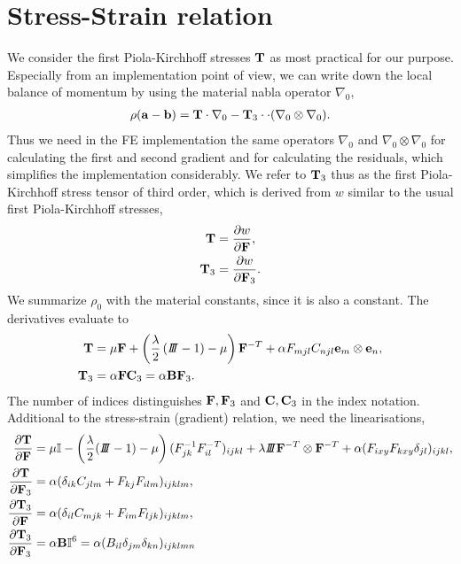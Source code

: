 \documentclass[a4paper]{article}
\begin{document}
\section{Stress-Strain relation}
We consider the first Piola-Kirchhoff stresses ${\mathbf{ T}}$ as most practical for 
our purpose. Especially from an implementation point of view, we can 
write down the local balance of momentum by using the material nabla 
operator $\nabla_0$,
\begin{align}
\rho({\mathbf{ a}}-{\mathbf{ b}})={\mathbf{ T}}\cdot\nabla_0-{\mathbf{ T}}_3\cdot\cdot(\nabla_0\otimes\nabla_0).
\end{align}
Thus we need in the FE implementation the same operators 
$\nabla_0$ and $\nabla_0\otimes\nabla_0$
for calculating the first and second gradient and for 
calculating the residuals, which 
simplifies the implementation considerably. 
We refer to ${\mathbf{ T}}_3$ thus as the first Piola-Kirchhoff stress tensor of 
third order, which is derived from $w$ similar to the usual first 
Piola-Kirchhoff stresses,
\begin{align}
{\mathbf{ T}}  &=\frac{\partial w}{\partial {\mathbf{ F}}},\\
{\mathbf{ T}}_3&=\frac{\partial w}{\partial {\mathbf{ F}}_3}.
\end{align}
We summarize $\rho_0$ with the material constants, since it is also a 
constant. The derivatives evaluate to
\begin{align}
{\mathbf{ T}}  &=\mu {\mathbf{ F}} + \left(\frac{\lambda}{2}\left(I\!\!I\!\!I-1\right)-\mu\right) 
{\mathbf{ F}}^{-T}+\alpha F_{mjl} C_{njl}{\mathbf{ e}}_m\otimes{\mathbf{ e}}_n,\\
{\mathbf{ T}}_3 &=\alpha {\mathbf{ F}}{\mathbf{ C}}_3=\alpha{\mathbf{ B}}{\mathbf{ F}}_3.
\end{align}
The number of indices distinguishes ${\mathbf{ F}},{\mathbf{ F}}_3$ and ${\mathbf{ C}},{\mathbf{ C}}_3$ in the 
index notation. Additional   to the stress-strain (gradient) relation, 
we need the linearisations,
\begin{align}
\frac{\partial\fT}{\partial\fF}   &=\mu \ffI - \left(\frac{\lambda}{2} 
(\III-1)-\mu\right)(F^{-1}_{jk}F^{-T}_{il})_{ijkl}+\lambda\III\fF^{-T}\otimes\fF^{-T}+\alpha(F_{ixy}F_{kxy}\delta_{jl})_{ijkl},\\
\frac{\partial\fT}{\partial\fF_3} &=\alpha(\delta_{ik}C_{jlm}+F_{kj}F_{ilm})_{ijklm},\\
\frac{\partial\fT_3}{\partial\fF} &=\alpha(\delta_{il}C_{mjk}+F_{im}F_{ljk})_{ijklm},\\
\frac{\partial\fT_3}{\partial\fF_3}&=\alpha\fB\ffI^6=\alpha(B_{il}\delta_{jm}\delta_{kn})_{ijklmn}
\end{align}
\end{document}
